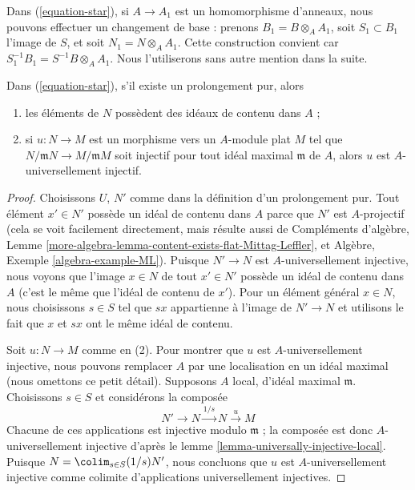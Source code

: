 \medskip\noindent
Dans (\ref{equation-star}), si $A \to A_1$ est un homomorphisme d'anneaux, nous
pouvons effectuer un changement de base : prenons $B_1 = B \otimes_A A_1$, soit
$S_1 \subset B_1$ l'image de $S$, et soit $N_1 = N \otimes_A A_1$. Cette construction convient
car $S_1^{-1}B_1 = S^{-1}B \otimes_A A_1$. Nous l'utiliserons
sans autre mention dans la suite.

\begin{lemma}
\label{lemma-properties-pure-spreadout}
Dans (\ref{equation-star}), s'il existe un prolongement pur, alors
\begin{enumerate}
\item les éléments de $N$ possèdent des idéaux de contenu dans $A$ ;
\item si $u : N \to M$ est un morphisme vers un $A$-module plat $M$
tel que $N/\mathfrak m N \to M/\mathfrak m M$ soit injectif
pour tout idéal maximal $\mathfrak m$ de $A$, alors $u$ est
$A$-universellement injectif.
\end{enumerate}
\end{lemma}

\begin{proof}
Choisissons $U$, $N'$ comme dans la définition d'un prolongement pur.
Tout élément $x' \in N'$ possède un idéal de contenu dans $A$ parce que
$N'$ est $A$-projectif (cela se voit facilement directement, mais
résulte aussi de Compléments d'algèbre, Lemme
\ref{more-algebra-lemma-content-exists-flat-Mittag-Leffler}, et
Algèbre, Exemple \ref{algebra-example-ML}).
Puisque $N' \to N$ est $A$-universellement injective, nous voyons que
l'image $x \in N$ de tout $x' \in N'$ possède un idéal de contenu dans $A$
(c'est le même que l'idéal de contenu de $x'$).
Pour un élément général $x \in N$, nous choisissons $s \in S$ tel que
$s x$ appartienne à l'image de $N' \to N$ et utilisons le fait que $x$ et $sx$
ont le même idéal de contenu.

\medskip\noindent
Soit $u : N \to M$ comme en (2). Pour montrer que $u$ est $A$-universellement
injective, nous pouvons remplacer $A$ par une localisation en un idéal maximal
(nous omettons ce petit détail). Supposons $A$ local, d'idéal maximal $\mathfrak m$.
Choisissons $s \in S$ et considérons la composée
$$
N' \to N \xrightarrow{1/s} N \xrightarrow{u} M
$$
Chacune de ces applications est injective modulo $\mathfrak m$ ; la composée
est donc $A$-universellement injective d'après le
lemme \ref{lemma-universally-injective-local}.
Puisque $N = \colim_{s \in S} (1/s)N'$, nous concluons que $u$
est $A$-universellement injective comme colimite d'applications universellement injectives.
\end{proof}

